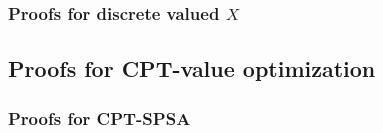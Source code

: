 \subsubsection{Proofs for discrete valued $X$}
\label{sec:proofs-discrete}


\subsection{Proofs for CPT-value optimization}
\subsubsection{Proofs for CPT-SPSA}
\label{appendix:1spsa}


